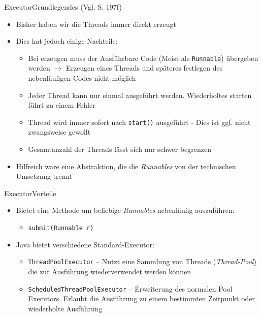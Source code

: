 \begin{frame}{Executor}{Grundlegendes (Vgl. \cite{ullenboom2014java} S. 197f)}
    \begin{itemize}
        \item Bisher haben wir die Threads immer direkt erzeugt
        \item Dies hat jedoch einige Nachteile:
        \begin{itemize}
            \item Bei erzeugen muss der Ausführbare Code (Meist als \texttt{Runnable}) übergeben werden $\rightarrow$ Erzeugen eines Threads und späteres festlegen des nebenläufigen Codes nicht möglich
            \item Jeder Thread kann nur einmal ausgeführt werden. Wiederholtes starten führt zu einem Fehler
            \item Thread wird immer sofort nach \texttt{start()} ausgeführt - Dies ist ggf. nicht zwangsweise gewollt
            \item Gesamtanzahl der Threads lässt sich nur schwer begrenzen
        \end{itemize}
        \item Hilfreich wäre eine Abstraktion, die die \textit{Runnables} von der technischen Umsetzung trennt
    \end{itemize}
\end{frame}

\begin{frame}{Executor}{Vorteile}
    \begin{itemize}
        \item Bietet eine Methode um beliebige \textit{Runnables} nebenläufig auszuführen:
        \begin{itemize}
            \item \texttt{submit(Runnable r)}
        \end{itemize}
        \item Java bietet verschiedene Standard-Executor:
        \begin{itemize}
            \item \texttt{ThreadPoolExecutor} -- Nutzt eine Sammlung von Threads (\textit{Thread-Pool}) die zur Ausführung wiederverwendet werden können
            \item \texttt{ScheduledThreadPoolExecutor} -- Erweiterung des normalen Pool Executors. Erlaubt die Ausführung zu einem bestimmten Zeitpunkt oder wiederholte Ausführung
        \end{itemize}
    \end{itemize}
\end{frame}

